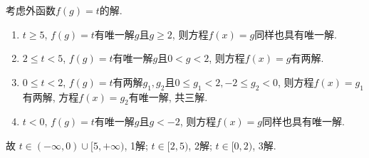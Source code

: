 \documentclass[8pt]{article}
\begin{document}
\begin{enumerate}[label=\arabic*.]
	    	考虑外函数$f(g)=t$的解.

	    	\begin{enumerate}[label=$\arabic*^{\circ}$]
	    		\item $t\geq 5$, $f(g)=t$有唯一解$g$且$g \geq 2$, 则方程$f(x)=g$同样也具有唯一解.

	    		\item $2\leq t<5$, $f(g)=t$有唯一解$g$且$0<g<2$, 则方程$f(x)=g$有两解.

	    		\item $0\leq t<2$, $f(g)=t$有两解$g_1, g_2$且$0\leq g_1<2, -2\leq g_2<0$, 则方程$f(x)=g_1$有两解, 方程$f(x)=g_2$有唯一解, 共三解.

	    		\item $t<0$, $f(g)=t$有唯一解$g$且$g<-2$, 则方程$f(x)=g$同样也具有唯一解.
	    	\end{enumerate}

	    	故 $t\in(-\infty, 0)\cup[5, +\infty)$, 1解; $t\in[2, 5)$, 2解; $t\in[0, 2)$, 3解.

	\end{enumerate}
\end{document}
